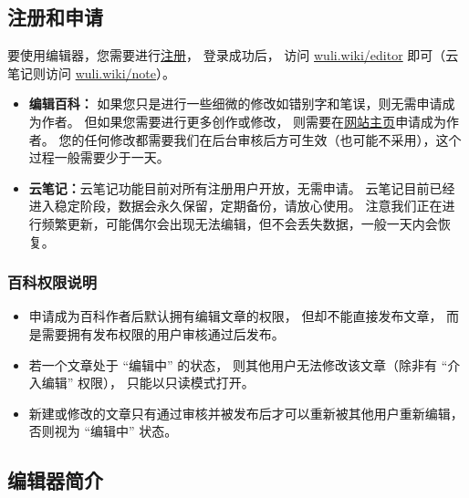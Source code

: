 \subsection{注册和申请}
要使用编辑器，您需要进行\href{https://wuli.wiki/forum}{注册}， 登录成功后， 访问 \href{https://wuli.wiki/editor/}{wuli.wiki/editor} 即可（云笔记则访问 \href{https://wuli.wiki/note/}{wuli.wiki/note}）。
\begin{itemize}
\item \textbf{编辑百科：} 如果您只是进行一些细微的修改如错别字和笔误，则无需申请成为作者。 但如果您需要进行更多创作或修改， 则需要在\href{https://wuli.wiki}{网站主页}申请成为作者。 您的任何修改都需要我们在后台审核后方可生效（也可能不采用），这个过程一般需要少于一天。
\item \textbf{云笔记：}云笔记功能目前对所有注册用户开放，无需申请。 云笔记目前已经进入稳定阶段，数据会永久保留，定期备份，请放心使用。 注意我们正在进行频繁更新，可能偶尔会出现无法编辑，但不会丢失数据，一般一天内会恢复。
\end{itemize}

\subsubsection{百科权限说明}
\begin{itemize}
\item 申请成为百科作者后默认拥有编辑文章的权限， 但却不能直接发布文章， 而是需要拥有发布权限的用户审核通过后发布。
\item 若一个文章处于 “编辑中” 的状态， 则其他用户无法修改该文章（除非有 “介入编辑” 权限）， 只能以只读模式打开。
\item 新建或修改的文章只有通过审核并被发布后才可以重新被其他用户重新编辑， 否则视为 “编辑中” 状态。
\end{itemize}

\subsection{编辑器简介}

